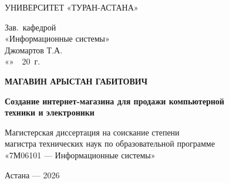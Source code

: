 \documentclass[14pt,a4paper]{extreport}
\begin{document}
\begin{titlepage}
\begin{center}
{\normalsize УНИВЕРСИТЕТ «ТУРАН-АСТАНА»}
\end{center}

\begin{flushright}
\begin{minipage}{0.45\textwidth}
\small
Зав.~кафедрой\\
«Информационные системы»\\
\underline{\hspace{3cm}} Джомартов Т.А.\\[4pt]
«\underline{\quad}»~\underline{\hspace{2.5cm}}~20\underline{\quad}~г.
\end{minipage}
\end{flushright}

\vspace{2.5cm}
\begin{center}
{\large \textbf{МАГАВИН АРЫСТАН ГАБИТОВИЧ}}

\vspace{1.5cm}
{\normalsize \textbf{Создание интернет-магазина для продажи компьютерной\\
техники и электроники}}

\vspace{1.2cm}
{\small Магистерская диссертация на соискание степени\\
магистра технических наук по образовательной программе\\
«7М06101 --- Информационные системы»}
\end{center}

\vspace{2.5cm}
\begin{flushleft}
\hspace{1cm}
\end{flushleft}

\vfill
\begin{center}
{\normalsize Астана --- 2026}
\end{center}
\end{titlepage}
\end{document}
